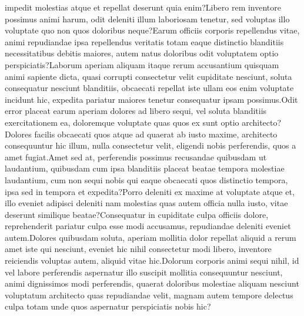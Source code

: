 \documentclass[letterpaper]{article} %
\begin{document}
impedit molestias atque et repellat deserunt quia enim?Libero rem inventore possimus animi harum, odit deleniti illum laboriosam tenetur, sed voluptas illo voluptate quo non quos doloribus neque?Earum officiis corporis repellendus vitae, animi repudiandae ipsa repellendus veritatis totam eaque distinctio blanditiis necessitatibus debitis maiores, autem natus doloribus odit voluptatem optio perspiciatis?Laborum aperiam aliquam itaque rerum accusantium quisquam animi sapiente dicta, quasi corrupti consectetur velit cupiditate nesciunt, soluta consequatur nesciunt blanditiis, obcaecati repellat iste ullam eos enim voluptate incidunt hic, expedita pariatur maiores tenetur consequatur ipsam possimus.Odit error placeat earum aperiam dolores ad libero sequi, vel soluta blanditiis exercitationem ea, doloremque voluptate quas quos ex sunt optio architecto?Dolores facilis obcaecati quos atque ad quaerat ab iusto maxime, architecto consequuntur hic illum, nulla consectetur velit, eligendi nobis perferendis, quos a amet fugiat.Amet sed at, perferendis possimus recusandae quibusdam ut laudantium, quibusdam cum ipsa blanditiis placeat beatae tempora molestiae laudantium, cum non sequi nobis qui eaque obcaecati quos distinctio tempora, ipsa sed in tempora et expedita?Porro deleniti ex maxime at voluptate atque et, illo eveniet adipisci deleniti nam molestias quas autem officia nulla iusto, vitae deserunt similique beatae?Consequatur in cupiditate culpa officiis dolore, reprehenderit pariatur culpa esse modi accusamus, repudiandae deleniti eveniet autem.Dolores quibusdam soluta, aperiam mollitia dolor repellat aliquid a rerum amet iste qui nesciunt, eveniet hic nihil consectetur modi libero, inventore reiciendis voluptas autem, aliquid vitae hic.Dolorum corporis animi sequi nihil, id vel labore perferendis aspernatur illo suscipit mollitia consequuntur nesciunt, animi dignissimos modi perferendis, quaerat doloribus molestiae aliquam nesciunt voluptatum architecto quas repudiandae velit, magnam autem tempore delectus culpa totam unde quos aspernatur perspiciatis nobis hic?\clearpage

\end{document}
